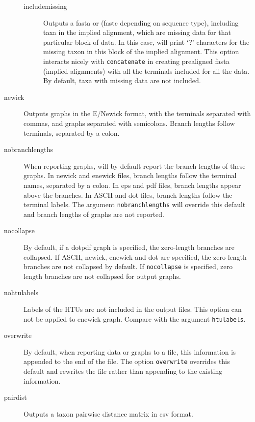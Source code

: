 \begin{description}
\begin{description}
			\item[includemissing] Outputs a fasta or (fastc depending on sequence type), 
			including taxa in the implied
			alignment, which are missing data for that particular block of data.
			In this case, \phyg will print `?' characters for the missing taxon in 
			this block of the implied alignment. This option interacts nicely with 
			\texttt{concatenate} in creating prealigned fasta (implied alignments) 
			with all the terminals included for all the data. By default, taxa with 
			missing data are not included.
			
		\end{description}
				
		\item[newick] Outputs graphs in the E/Newick format, with the terminals
		separated with commas, and graphs separated with semicolons. Branch
		lengths follow terminals, separated by a colon.
		
		\item[nobranchlengths] When reporting graphs, \phyg will by default 
		report the branch lengths of these graphs. In newick and enewick files, 
		branch lengths follow the terminal names, separated by a colon. In eps 
		and pdf files, branch lengths appear above the branches. In ASCII and 
		dot files, branch lengths follow the terminal labels. The argument
		\texttt{nobranchlengths} will override this default and branch lengths 
		of graphs are not reported.
		
		\item[nocollapse] By default, if a dotpdf graph is specified, the zero-length
		branches are collapsed. If ASCII, newick, enewick and dot are specified, 
		the zero length branches are not collapsed by default.  If \texttt{nocollapse}
		is specified, zero length branches are not collapsed for output graphs.
		
		\item[nohtulabels] Labels of the HTUs are not included in the output files. 
		This option can not be applied to enewick graph. Compare with the argument 
		\texttt{htulabels}.
		
		\item[overwrite] By default, when reporting data or graphs to a file, this 
		information is appended to the end of the file. The option \texttt{overwrite} 
		overrides this default and rewrites the file rather than appending to the 
		existing information.

		\item[pairdist] Outputs a taxon pairwise distance matrix in csv format. 
		

\end{description}

